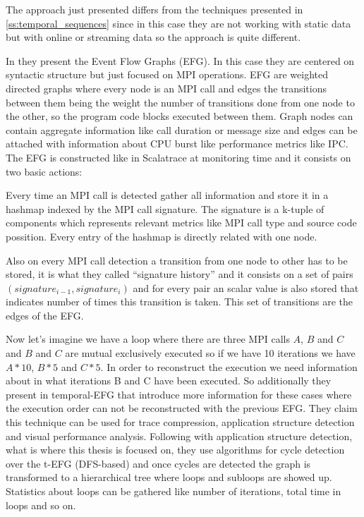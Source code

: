 The approach just presented differs from the techniques presented in
\ref{ss:temporal_sequences} since in this case they are not working with static
data but with online or streaming data so the approach is quite different.

In \cite{aguilar2014mpi} they present the Event Flow Graphs (EFG). In this case 
they are centered on
syntactic structure but just focused on MPI operations. EFG are
weighted directed graphs where every node is an MPI call and edges the
transitions between them being the weight the number of transitions done
from one node to the other, so the program code blocks executed between them.
Graph nodes can contain aggregate information like call duration or message size
and edges can be attached with information about CPU burst like performance
metrics like IPC. 
The EFG is constructed like in Scalatrace at monitoring time and it consists on
two basic actions: 
\begin{enumerate*}[label=\roman*)]
  \item Every time an MPI call is detected gather all information and store it
    in a hashmap indexed by the MPI call signature. The signature is a k-tuple
    of components which represents relevant metrics like MPI call type and
    source code possition. Every entry of the hashmap is directly related with
    one node.
  \item Also on every MPI call detection a transition from one node to other has
    to be stored, it is what they called ``signature history'' and it consists
    on a set of pairs $(signature_{i-1}, signature_{i})$ and for every pair an
    scalar value is also stored that indicates number of times this transition
    is taken. This set of transitions are the edges of the EFG.
\end{enumerate*}

Now let's imagine we have a loop where there are three MPI calls $A$, $B$ and
$C$ and $B$ and $C$ are mutual exclusively executed so if we have 10 
iterations we have $A*10$, $B*5$ and $C*5$. In order to reconstruct the execution
we need information about in what iterations B and C have been executed.
So additionally they present in \cite{aguilar2016event} temporal-EFG that 
introduce more
information for these cases where the execution order can not be reconstructed
with the previous EFG. They claim this technique can be used for trace
compression, application structure detection and visual performance analysis.
Following with application structure detection, what is where this thesis is
focused on, they use algorithms for cycle detection over the t-EFG (DFS-based)
and once cycles are detected the graph is transformed to a hierarchical tree
where loops and subloops are showed up. Statistics about loops can be gathered
like number of iterations, total time in loops and so on.

